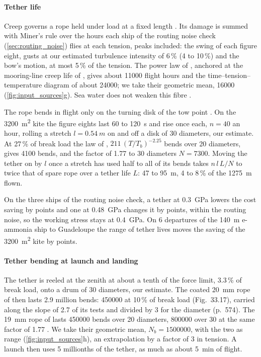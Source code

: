 \paragraph{Tether life}\label{app:tether_life} Creep governs a rope held under load at a fixed length \citep{bosman2013}. Its damage is summed with Miner's rule over the hours each ship of the routing noise check (\cref{sec:routing_noise}) flies at each tension, peaks included: the swing of each figure eight, gusts at our estimated turbulence intensity of 6\,\% (4 to 10\,\%) and the bow's motion, at most 5\,\% of the tension. The power law of \citet{humeau2018}, anchored at the mooring-line creep life of \citet{dsm_sk78_mooring}, gives about \num{11000} flight hours and the time--tension--temperature diagram of \citet{bosman2013} about \num{24000}; we take their geometric mean, \num{16000} (\cref{fig:input_sources}g). Sea water does not weaken this fibre \citep{dsm_sk78_mooring}.

The rope bends in flight only on the turning disk of the tow point \citep{skysails_patent_US11578697}. On the \SI{3200}{m^2} kite the figure eights last 60 to \SI{120}{s} and rise once each, $n=40$ an hour, rolling a stretch $l=\SI{0.54}{m}$ on and off a disk of 30 diameters, our estimate. At 27\,\% of break load the law of \citet{davies2015}, $211\,(T/T_b)^{-2.25}$ bends over 20 diameters, gives \num{4100} bends, and the factor of 1.77 to 30 diameters \citep[Fig.~33.17]{bosman2013} $N=\num{7300}$. Moving the tether on by $l$ once a stretch has used half to all of its bends takes $n\,l\,L/N$ to twice that of spare rope over a tether life $L$: 47 to \SI{95}{m}, 4 to 8\,\% of the \SI{1275}{m} flown.

On the three ships of the routing noise check, a tether at \SI{0.3}{GPa} lowers the cost saving by  points and one at \SI{0.48}{GPa} changes it by  points, within the routing noise, so the working stress stays at \SI{0.4}{GPa}. On 6 departures of the \SI{140}{m} e-ammonia ship to Guadeloupe the range of tether lives moves the saving of the \SI{3200}{m^2} kite by  points.

\paragraph{Tether bending at launch and landing}
\label{app:tether_bending}
The tether is reeled at the zenith at about a tenth of the force limit, 3.3\,\% of break load, onto a drum of 30 diameters, our estimate. The coated \SI{20}{mm} rope of \citet{bosman2013} then lasts \num{2.9} million bends: \num{450000} at 10\,\% of break load (Fig.~33.17), carried along the slope of 2.7 of its tests and divided by 3 for the diameter (p.~574). The \SI{19}{mm} rope of \citet{davies2015} lasts \num{450000} bends over 20 diameters, \num{800000} over 30 at the same factor of 1.77 \citep[Fig.~33.17]{bosman2013}. We take their geometric mean, $N_b=\num{1500000}$, with the two as range (\cref{fig:input_sources}h), an extrapolation by a factor of 3 in tension. A launch then uses 5 millionths of the tether, as much as about \SI{5}{min} of flight.

